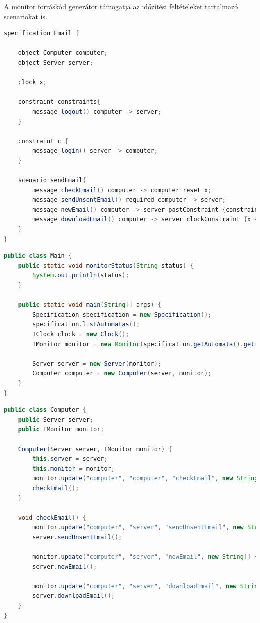 A monitor forráskód generátor támogatja az időzítési feltételeket tartalmazó scenariokat is.

\begin{lstlisting}[language=java, frame=single, float=ht!, caption={Időzítési feltételeket tartalmazó scenario.},captionpos=b]
specification Email {

	object Computer computer;
	object Server server;

	clock x;

	constraint constraints{
		message logout() computer -> server;
	}

	constraint c {
		message login() server -> computer;
	}

	scenario sendEmail{
		message checkEmail() computer -> computer reset x;
		message sendUnsentEmail() required computer -> server;
		message newEmail() computer -> server pastConstraint {constraints};
		message downloadEmail() computer -> server clockConstraint {x < 10};
	}
}
\end{lstlisting}

\begin{lstlisting}[language=java, frame=single, float=ht!, caption={Időzítéses példához tartozó Main osztály.},captionpos=b]
public class Main {
	public static void monitorStatus(String status) {
		System.out.println(status);
	}

	public static void main(String[] args) {
		Specification specification = new Specification();
		specification.listAutomatas();
		IClock clock = new Clock();
		IMonitor monitor = new Monitor(specification.getAutomata().get(0), clock);

		Server server = new Server(monitor);
		Computer computer = new Computer(server, monitor);
	}
}
\end{lstlisting}

\begin{lstlisting}[language=java, frame=single, float=ht!, caption={A Computer java osztálya.},captionpos=b]
public class Computer {
	public Server server;
	public IMonitor monitor;

	Computer(Server server, IMonitor monitor) {
		this.server = server;
		this.monitor = monitor;
		monitor.update("computer", "computer", "checkEmail", new String[] {});
		checkEmail();
	}

	void checkEmail() {
		monitor.update("computer", "server", "sendUnsentEmail", new String[] {});
		server.sendUnsentEmail();

		monitor.update("computer", "server", "newEmail", new String[] {});
		server.newEmail();

		monitor.update("computer", "server", "downloadEmail", new String[] {});
		server.downloadEmail();
	}
}
\end{lstlisting}

